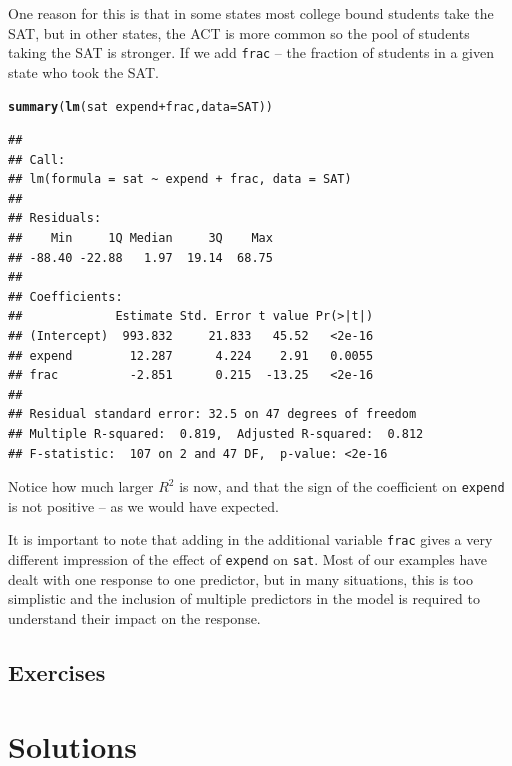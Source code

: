 \documentclass[twoside]{book}\usepackage[]{graphicx}\usepackage[]{xcolor}
\makeatletter
\newcommand{\hlopt}[1]{\textcolor[rgb]{0,0,0}{#1}}%
\newcommand{\hlstd}[1]{\textcolor[rgb]{0.345,0.345,0.345}{#1}}%
\newcommand{\hlkwc}[1]{\textcolor[rgb]{0.333,0.667,0.333}{#1}}%
\newcommand{\hlkwd}[1]{\textcolor[rgb]{0.737,0.353,0.396}{\textbf{#1}}}%
\newenvironment{kframe}{%
 \def\at@end@of@kframe{}%
 \ifinner\ifhmode%
  \def\at@end@of@kframe{\end{minipage}}%
  \begin{minipage}{\columnwidth}%
 \fi\fi%
 \def\FrameCommand##1{\hskip\@totalleftmargin \hskip-\fboxsep
 \colorbox{shadecolor}{##1}\hskip-\fboxsep
     \hskip-\linewidth \hskip-\@totalleftmargin \hskip\columnwidth}%
 \MakeFramed {\advance\hsize-\width
   \@totalleftmargin\z@ \linewidth\hsize
   \@setminipage}}%
 {\par\unskip\endMakeFramed%
 \at@end@of@kframe}
\newenvironment{knitrout}{}{} %
\newcommand{\variable}[1]{{\color{green!50!black}\texttt{#1}}}
\newcounter{example}[section]
\newif\ifsolutions
\newif\ifsolutionslocal
\makeatother
\begin{document}
One reason for this is that in some states most college bound students take the SAT, but in 
other states, the ACT is more common so the pool of students taking the SAT is stronger.
If we add \variable{frac} -- the fraction of students in a given state who took the SAT.
\begin{knitrout}
\color{fgcolor}\begin{kframe}
\begin{alltt}
\hlkwd{summary}\hlstd{(}\hlkwd{lm}\hlstd{(sat} \hlopt{~} \hlstd{expend} \hlopt{+} \hlstd{frac,} \hlkwc{data} \hlstd{= SAT))}
\end{alltt}
\begin{verbatim}
## 
## Call:
## lm(formula = sat ~ expend + frac, data = SAT)
## 
## Residuals:
##    Min     1Q Median     3Q    Max 
## -88.40 -22.88   1.97  19.14  68.75 
## 
## Coefficients:
##             Estimate Std. Error t value Pr(>|t|)
## (Intercept)  993.832     21.833   45.52   <2e-16
## expend        12.287      4.224    2.91   0.0055
## frac          -2.851      0.215  -13.25   <2e-16
## 
## Residual standard error: 32.5 on 47 degrees of freedom
## Multiple R-squared:  0.819,	Adjusted R-squared:  0.812 
## F-statistic:  107 on 2 and 47 DF,  p-value: <2e-16
\end{verbatim}
\end{kframe}
\end{knitrout}
Notice how much larger $R^2$ is now, and that the sign of the coefficient on \variable{expend}
is not positive -- as we would have expected.

It is important to note that adding in the additional variable \variable{frac} gives a very
different impression of the effect of \variable{expend} on \variable{sat}.  Most of our examples 
have dealt with one response to one predictor, but in many situations, this is too simplistic and
the inclusion of multiple predictors in the model is required to understand their impact on 
the response.






\newpage
\section{Exercises}

\shipoutProblems


\ifsolutions
\ifsolutionslocal
\newpage
\section*{Solutions}
\shipoutSolutions
\fi
\fi

\backmatter



\printindex

\ifsolutions
\ifsolutionslocal\relax
\else
\newpage
\chapter*{Solutions}
\shipoutSolutions
\fi
\fi
\end{document}
